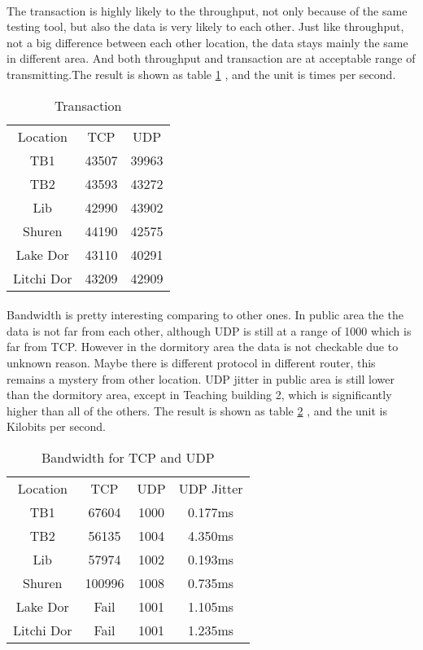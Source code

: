 \documentclass[paper=a4, fontsize=11pt]{scrartcl}
\numberwithin{equation}{section}
\numberwithin{figure}{section}
\numberwithin{table}{section}
\begin{document}
\paragraph{}
The transaction is highly likely to the throughput, not only because of the same testing tool, but also the data is very likely to each other. Just like throughput, not a big difference between each other location, the data stays mainly the same in different area. And both throughput and transaction are at acceptable range of transmitting.The result is shown as table \ref{tab:c5} , and the unit is times per second. 
\begin{table}[htbp]
  \centering
  \caption{Transaction}
    \begin{tabular}{ccc}
    Location  & TCP   & UDP \\
    TB1   & 43507 & 39963 \\
    TB2   & 43593 & 43272 \\
    Lib   & 42990 & 43902 \\
    Shuren & 44190 & 42575 \\
    Lake Dor & 43110 & 40291 \\
    Litchi Dor  & 43209 & 42909 \\
    \end{tabular}%
  \label{tab:c5}%
\end{table}%
\paragraph{}
Bandwidth is pretty interesting comparing to other ones. In public area the the data is not far from each other, although UDP is still at a range of 1000 which is far from TCP. However in the dormitory area the data is not checkable due to unknown reason. Maybe there is different protocol in different router, this remains a mystery from other location. UDP jitter in public area is still lower than the dormitory area, except in Teaching building 2, which is significantly higher than all of the others. The result is shown as table \ref{tab:c6} , and the unit is Kilobits per second. 
\begin{table}[htbp]
  \centering
  \caption{Bandwidth for TCP and UDP}
    \begin{tabular}{cccc}
    Location & TCP   & UDP   & UDP Jitter \\
    TB1   & 67604 & 1000  & 0.177ms \\
    TB2   & 56135 & 1004  & 4.350ms \\
    Lib   & 57974 & 1002  & 0.193ms \\
    Shuren & 100996 & 1008  & 0.735ms \\
    Lake Dor & Fail  & 1001  & 1.105ms \\
    Litchi Dor  & Fail  & 1001  & 1.235ms \\
    \end{tabular}%
  \label{tab:c6}%
\end{table}%
\end{document}
